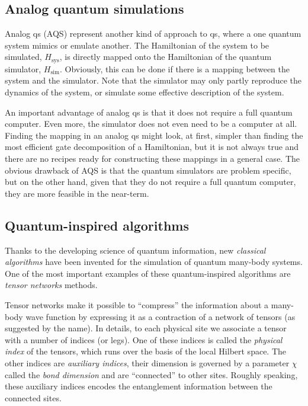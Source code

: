 \subsection{Analog quantum simulations}
\label{sub:analog_quantum_simulations}

Analog \ac{qs} (AQS) represent another kind of approach to \ac{qs}, where a one quantum system mimics or emulate another.
The Hamiltonian of the system to be simulated, $H_{\text{sys}}$, is directly mapped onto the Hamiltonian of the quantum simulator, $H_{\text{sim}}$.
Obviously, this can be done if there is a mapping between the system and the simulator.
Note that the simulator may only partly reproduce the dynamics of the system, or simulate some effective description of the system.

An important advantage of analog \ac{qs} is that it does not require a full quantum computer.
Even more, the simulator does not even need to be a computer at all.
Finding the mapping in an analog \ac{qs} might look, at first, simpler than finding the most efficient gate decomposition of a Hamiltonian, but it is not always true and there are no recipes ready for constructing these mappings in a general case.
The obvious drawback of AQS is that the quantum simulators are problem specific, but on the other hand, given that they do not require a full quantum computer, they are more feasible in the near-term.




\subsection{Quantum-inspired algorithms}
\label{sub:quantum_inspired_algorithms}

Thanks to the developing science of quantum information, new \emph{classical algorithms} have been invented for the simulation of quantum many-body systems.
One of the most important examples of these quantum-inspired algorithms are \emph{tensor networks} methods\citneeded.

Tensor networks make it possible to ``compress'' the information about a many-body wave function by expressing it as a contraction of a network of tensors (as suggested by the name).
In details, to each physical site we associate a tensor with a number of indices (or legs).
One of these indices is called the \emph{physical index} of the tensors, which runs over the basis of the local Hilbert space.
The other indices are \emph{auxiliary indices}, their dimension is governed by a parameter $\chi$ called the \emph{bond dimension} and are ``connected'' to other sites.
Roughly speaking, these auxiliary indices encodes the entanglement information between the connected sites.

